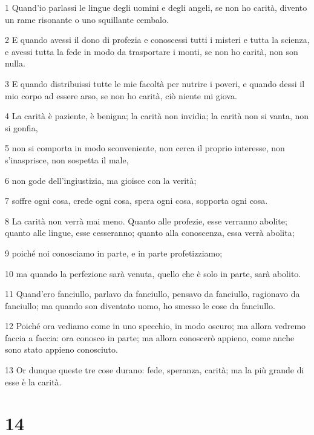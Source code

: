 \par 1 Quand'io parlassi le lingue degli uomini e degli angeli, se non ho carità, divento un rame risonante o uno squillante cembalo.
\par 2 E quando avessi il dono di profezia e conoscessi tutti i misteri e tutta la scienza, e avessi tutta la fede in modo da trasportare i monti, se non ho carità, non son nulla.
\par 3 E quando distribuissi tutte le mie facoltà per nutrire i poveri, e quando dessi il mio corpo ad essere arso, se non ho carità, ciò niente mi giova.
\par 4 La carità è paziente, è benigna; la carità non invidia; la carità non si vanta, non si gonfia,
\par 5 non si comporta in modo sconveniente, non cerca il proprio interesse, non s'inasprisce, non sospetta il male,
\par 6 non gode dell'ingiustizia, ma gioisce con la verità;
\par 7 soffre ogni cosa, crede ogni cosa, spera ogni cosa, sopporta ogni cosa.
\par 8 La carità non verrà mai meno. Quanto alle profezie, esse verranno abolite; quanto alle lingue, esse cesseranno; quanto alla conoscenza, essa verrà abolita;
\par 9 poiché noi conosciamo in parte, e in parte profetizziamo;
\par 10 ma quando la perfezione sarà venuta, quello che è solo in parte, sarà abolito.
\par 11 Quand'ero fanciullo, parlavo da fanciullo, pensavo da fanciullo, ragionavo da fanciullo; ma quando son diventato uomo, ho smesso le cose da fanciullo.
\par 12 Poiché ora vediamo come in uno specchio, in modo oscuro; ma allora vedremo faccia a faccia: ora conosco in parte; ma allora conoscerò appieno, come anche sono stato appieno conosciuto.
\par 13 Or dunque queste tre cose durano: fede, speranza, carità; ma la più grande di esse è la carità.

\chapter{14}

